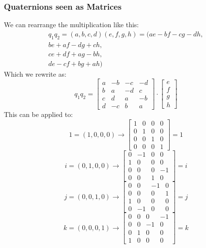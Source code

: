 \documentclass[10pt,a4paper]{article}
\begin{document}
\subsubsection{Quaternions seen as Matrices}
We can rearrange the multiplication like this:
\begin{equation*}
\begin{split}
q_1q_2 = (a,b,c,d)(e,f,g,h) = (ae - bf - cg - dh, \\
be + af - dg + ch, \\
ce + df + ag - bh, \\
de - cf + bg + ah)
\end{split}
\end{equation*}
Which we rewrite as: 
$$
q_1q_2 = 
\left[ {\begin{array}{cccc} 
	a & -b & -c & -d \\
	b & a & -d & c \\
	c & d & a & -b \\
	d & -c & b & a 
\end{array} } \right]
\cdot
\left[ {\begin{array}{c} 
	e \\
	f \\
	g \\
	h
\end{array} } \right]
$$
This can be applied to:
$$
1 = (1,0,0,0) \longrightarrow 
\left[ {\begin{array}{cccc} 
	1 & 0 & 0 & 0 \\
	0 & 1 & 0 & 0 \\
	0 & 0 & 1 & 0 \\
	0 & 0 & 0 & 1
\end{array} } \right]
= 1
$$
$$
i = (0,1,0,0) \longrightarrow 
\left[ {\begin{array}{cccc} 
	0 & -1 & 0 & 0 \\
	1 & 0 & 0 & 0 \\
	0 & 0 & 0 & -1 \\
	0 & 0 & 1 & 0
\end{array} } \right]
= i
$$
$$
j = (0,0,1,0) \longrightarrow 
\left[ {\begin{array}{cccc} 
	0 & 0 & -1 & 0 \\
	0 & 0 & 0 & 1 \\
	1 & 0 & 0 & 0 \\
	0 & -1 & 0 & 0
\end{array} } \right]
= j
$$
$$
k = (0,0,0,1) \longrightarrow 
\left[ {\begin{array}{cccc} 
	0 & 0 & 0 & -1 \\
	0 & 0 & -1 & 0 \\
	0 & 1 & 0 & 0 \\
	1 & 0 & 0 & 0
\end{array} } \right]
= k
$$
\end{document}
